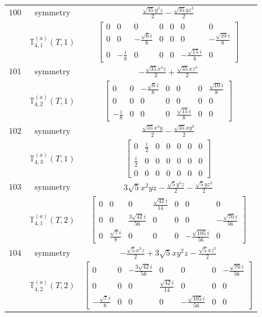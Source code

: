 \documentclass[fleqn,8pt,landscape]{jsarticle}
\begin{document}
\begin{longtable}{ccc}
$ 100 $ & $ \text{symmetry} $ & $ \frac{\sqrt{35} y^{3} z}{2} - \frac{\sqrt{35} y z^{3}}{2} $ \\
$  $ & $ \mathbb{T}_{4,1}^{(a)}(T,1) $ & $ \begin{bmatrix} 0 & 0 & 0 & 0 & 0 & 0 & 0 \\ 0 & 0 & - \frac{\sqrt{6} i}{8} & 0 & 0 & 0 & - \frac{\sqrt{10} i}{8} \\ 0 & - \frac{i}{8} & 0 & 0 & 0 & - \frac{\sqrt{15} i}{8} & 0 \end{bmatrix} $ \\ \hline
$ 101 $ & $ \text{symmetry} $ & $ - \frac{\sqrt{35} x^{3} z}{2} + \frac{\sqrt{35} x z^{3}}{2} $ \\
$  $ & $ \mathbb{T}_{4,2}^{(a)}(T,1) $ & $ \begin{bmatrix} 0 & 0 & - \frac{\sqrt{6} i}{8} & 0 & 0 & 0 & \frac{\sqrt{10} i}{8} \\ 0 & 0 & 0 & 0 & 0 & 0 & 0 \\ - \frac{i}{8} & 0 & 0 & 0 & \frac{\sqrt{15} i}{8} & 0 & 0 \end{bmatrix} $ \\ \hline
$ 102 $ & $ \text{symmetry} $ & $ \frac{\sqrt{35} x^{3} y}{2} - \frac{\sqrt{35} x y^{3}}{2} $ \\
$  $ & $ \mathbb{T}_{4,3}^{(a)}(T,1) $ & $ \begin{bmatrix} 0 & \frac{i}{2} & 0 & 0 & 0 & 0 & 0 \\ \frac{i}{2} & 0 & 0 & 0 & 0 & 0 & 0 \\ 0 & 0 & 0 & 0 & 0 & 0 & 0 \end{bmatrix} $ \\ \hline
$ 103 $ & $ \text{symmetry} $ & $ 3 \sqrt{5} x^{2} y z - \frac{\sqrt{5} y^{3} z}{2} - \frac{\sqrt{5} y z^{3}}{2} $ \\
$  $ & $ \mathbb{T}_{4,1}^{(a)}(T,2) $ & $ \begin{bmatrix} 0 & 0 & 0 & \frac{\sqrt{42} i}{14} & 0 & 0 & 0 \\ 0 & 0 & \frac{3 \sqrt{42} i}{56} & 0 & 0 & 0 & - \frac{\sqrt{70} i}{56} \\ 0 & \frac{\sqrt{7} i}{8} & 0 & 0 & 0 & - \frac{\sqrt{105} i}{56} & 0 \end{bmatrix} $ \\ \hline
$ 104 $ & $ \text{symmetry} $ & $ - \frac{\sqrt{5} x^{3} z}{2} + 3 \sqrt{5} x y^{2} z - \frac{\sqrt{5} x z^{3}}{2} $ \\
$  $ & $ \mathbb{T}_{4,2}^{(a)}(T,2) $ & $ \begin{bmatrix} 0 & 0 & - \frac{3 \sqrt{42} i}{56} & 0 & 0 & 0 & - \frac{\sqrt{70} i}{56} \\ 0 & 0 & 0 & \frac{\sqrt{42} i}{14} & 0 & 0 & 0 \\ - \frac{\sqrt{7} i}{8} & 0 & 0 & 0 & - \frac{\sqrt{105} i}{56} & 0 & 0 \end{bmatrix} $ \\ \hline

\end{longtable}
\end{document}
